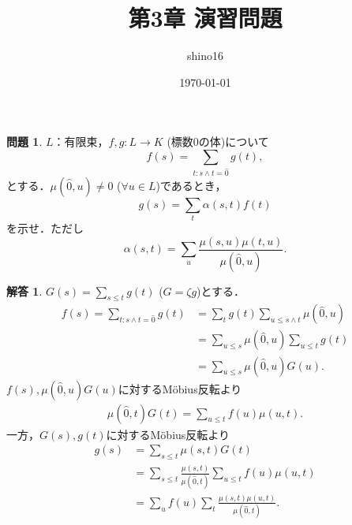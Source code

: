 \documentclass[xelatex,ja=standard,a4paper,14pt,everyparhook=compat]{bxjsarticle}
\title{第3章 演習問題}
\author{shino16}
\date{\today}
\theoremstyle{definition}
\newtheorem{problem}{問題}
\newtheorem*{answer}{解答}
\begin{document}
\maketitle

\newpage

\setcounter{problem}{85}
\begin{problem}
$L$：有限束，$f,g : L \to K$ (標数$0$の体)について \begin{equation*}
    f(s) = \sum_{t : s \land t = \hat 0} g(t),
\end{equation*}
とする．$\mu(\hat 0, u) \neq 0$ ($\forall u \in L$)であるとき， \begin{equation*}
    g(s) = \sum_t \alpha(s,t) f(t)
\end{equation*}
を示せ．ただし \begin{equation*}
    \alpha(s,t) = \sum_u \frac{\mu(s,u) \mu(t,u)}{\mu(\hat 0, u)}.
\end{equation*}
\end{problem}

\begin{answer}
    $G(s) = \sum_{s \leq t} g(t)$ ($G = \zeta g$)とする． \begin{align*}
        f(s) = \sum_{t : s \land t = \hat 0} g(t)
         & = \sum_t g(t) \sum_{u \leq s \land t} \mu(\hat 0, u)  \\
         & = \sum_{u \leq s} \mu(\hat 0, u) \sum_{u \leq t} g(t) \\
         & = \sum_{u \leq s} \mu(\hat 0, u) G(u).
    \end{align*}
    $f(s), \mu(\hat 0, u) G(u)$に対するM\"obius反転より \begin{align*}
        \mu(\hat 0, t) G(t) = \sum_{u \leq t} f(u) \mu(u, t).
    \end{align*}
    一方，$G(s), g(t)$に対するM\"obius反転より \begin{align*}
        g(s) & = \sum_{s \leq t} \mu(s, t) G(t)                                               \\
             & = \sum_{s \leq t} \frac{\mu(s,t)}{\mu(\hat0,t)} \sum_{u \leq t} f(u) \mu(u, t) \\
             & = \sum_u f(u) \sum_t \frac{\mu(s,t) \mu(u,t)}{\mu(\hat0,t)}.
    \end{align*}
\end{answer}
\end{document}
